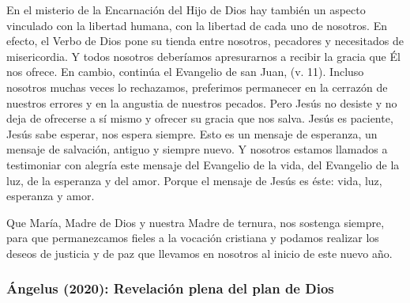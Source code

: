 \begin{body}
					En el misterio de la Encarnación del Hijo de Dios hay también un aspecto vinculado con la libertad humana, con la libertad de cada uno de nosotros. En efecto, el Verbo de Dios pone su tienda entre nosotros, pecadores y necesitados de misericordia. Y todos nosotros deberíamos apresurarnos a recibir la gracia que Él nos ofrece. En cambio, continúa el Evangelio de san Juan,  (v. 11). Incluso nosotros muchas veces lo rechazamos, preferimos permanecer en la cerrazón de nuestros errores y en la angustia de nuestros pecados. Pero Jesús no desiste y no deja de ofrecerse a sí mismo y ofrecer su gracia que nos salva. Jesús es paciente, Jesús sabe esperar, nos espera siempre. Esto es un mensaje de esperanza, un mensaje de salvación, antiguo y siempre nuevo. Y nosotros estamos llamados a testimoniar con alegría este mensaje del Evangelio de la vida, del Evangelio de la luz, de la esperanza y del amor. Porque el mensaje de Jesús es éste: vida, luz, esperanza y amor.
					
					Que María, Madre de Dios y nuestra Madre de ternura, nos sostenga siempre, para que permanezcamos fieles a la vocación cristiana y podamos realizar los deseos de justicia y de paz que llevamos en nosotros al inicio de este nuevo año.
				\end{body}
			
			\subsubsection{Ángelus (2020): Revelación plena del plan de Dios}
			
				
